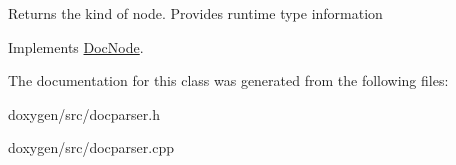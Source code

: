 Returns the kind of node. Provides runtime type information 

Implements \mbox{\hyperlink{class_doc_node_a108ffd214a72ba6e93dac084a8f58049}{Doc\+Node}}.



The documentation for this class was generated from the following files\+:\begin{DoxyCompactItemize}
\item 
doxygen/src/docparser.\+h\item 
doxygen/src/docparser.\+cpp\end{DoxyCompactItemize}
